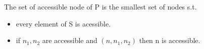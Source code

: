 \documentclass[11pt]{article}
\begin{document}
\begin{enumerate}
\begin{enumerate}
The set of accessible node of P is the smallest set of nodes s.t.
\begin{itemize}
\item every element of S is acessible.
\item if $n_{1}, n_{2}$ are accessible and $(n,n_{1}, n_{2})$ then n 
is accessible.
\end{itemize}
\end{enumerate}
\end{enumerate}
\end{document}
